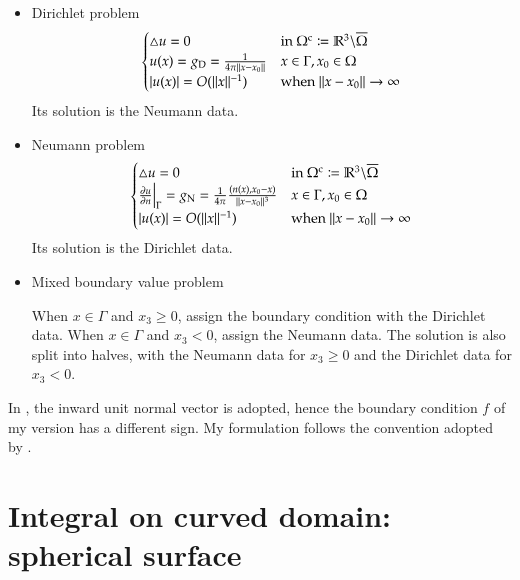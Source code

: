 \documentclass[11pt, a4paper]{book}
\begin{document}
\begin{itemize}
\item Dirichlet problem
  \begin{equation}
    \begin{cases}
      \triangle u = 0 & \text{in $\Omega^{\rm c}\coloneqq\mathbb{R}^3\backslash\overline{\Omega}$} \\
      u(x) = g_{\rm D} = \frac{1}{4\pi\lVert x-x_0\rVert} & x\in\Gamma, x_0\in\Omega \\
      \lvert u(x)\rvert = O(\lVert x\rVert^{-1}) & \text{when $\lVert x-x_0\rVert\rightarrow\infty$}
    \end{cases}
  \end{equation}
  Its solution is the Neumann data.
\item Neumann problem
  \begin{equation}
    \begin{cases}
      \triangle u = 0 & \text{in $\Omega^{\rm c}\coloneqq\mathbb{R}^3\backslash\overline{\Omega}$} \\
      \frac{\partial u}{\partial n}\Big\vert_{\Gamma} = g_{\rm N} = \frac{1}{4\pi}\frac{(n(x),
        x_0-x)}{\lVert x-x_0\rVert^3} & x\in\Gamma, x_0\in\Omega \\
      \lvert u(x)\rvert = O(\lVert x\rVert^{-1}) & \text{when $\lVert x-x_0\rVert\rightarrow\infty$}
    \end{cases}
  \end{equation}
  Its solution is the Dirichlet data.
\item Mixed boundary value problem

  When $x\in\Gamma$ and $x_3\geq 0$, assign the boundary condition with the Dirichlet data.
  When $x\in\Gamma$ and $x_3<0$, assign the Neumann data. The solution is also split into
  halves, with the Neumann data for $x_3\geq 0$ and the Dirichlet data for $x_3<0$.
\end{itemize}

\begin{mycomment}
  In \cite{ErichsenEfficient1998}, the inward unit normal vector is adopted, hence the
  boundary condition $f$ of my version has a different sign. My formulation follows the
  convention adopted by \cite{SteinbachNumerical2007}.
\end{mycomment}

\section{Integral on curved domain: spherical surface}
\end{document}

